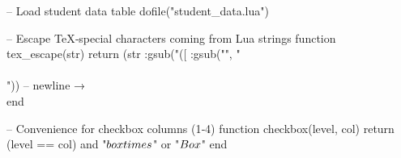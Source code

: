 



\begin{luacode*}
	-- Load student data table
	dofile("student_data.lua")
	
	-- Escape TeX‑special characters coming from Lua strings
	function tex_escape(str)
	return (str
	:gsub("([%
	:gsub("\n", "\\\\"))              -- newline → \\
	end
	
	-- Convenience for checkbox columns (1‑4)
	function checkbox(level, col)
	return (level == col) and "$\\boxtimes$" or "$\\Box$"
	end
\end{luacode*}


	
%	

	\newpage
	
	


